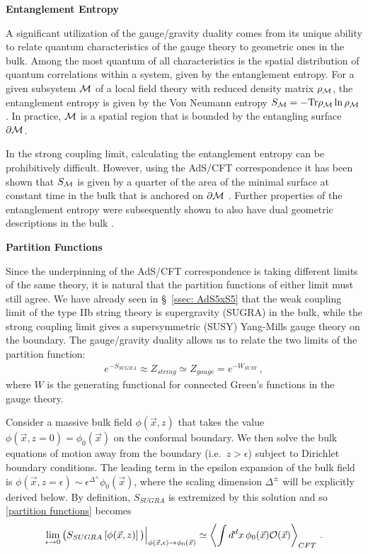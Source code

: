 \documentclass[../PhD.tex]{subfiles}
\begin{document}
\pagebreak

{\bf Entanglement Entropy}

A significant utilization of the gauge/gravity duality comes from its unique ability to relate quantum characteristics of the gauge theory to geometric ones in the bulk. Among the most quantum of all characteristics is the spatial distribution of quantum correlations within a system, given by the entanglement entropy. For a given subsystem $\mathcal M$ of a local field theory with reduced density matrix $\rho_{\mathcal M}$, the entanglement entropy is given by the Von Neumann entropy $S_{\mathcal M} = - \text{Tr} \rho_{\mathcal M} \ln \rho_{\mathcal M}$. In practice, $\mathcal M$ is a spatial region that is bounded by the entangling surface $\partial \mathcal M$.

In the strong coupling limit, calculating the entanglement entropy can be prohibitively difficult. However, using the AdS/CFT correspondence it has been shown that $S_{\mathcal M}$ is given by a quarter of the area of the minimal surface at constant time in the bulk that is anchored on $\partial \mathcal M$ \cite{hep-th/0603001}. Further properties of the entanglement entropy were subsequently shown to also have dual geometric descriptions in the bulk \cite{1304.4926}.

{\bf Partition Functions}

Since the underpinning of the AdS/CFT correspondence is taking different limits of the same theory, it is natural that the partition functions of either limit must still agree. We have already seen in \S~\!\ref{ssec: AdS5xS5} that the weak coupling limit of the type IIb string theory is supergravity (SUGRA) in the bulk, while the strong coupling limit gives a supersymmetric (SUSY) Yang-Mills gauge theory on the boundary. The gauge/gravity duality allows us to relate the two limits of the partition function:
\begin{align}
\label{partition functions}
e^{-S_{SUGRA}} \approx Z_{string} \simeq Z_{gauge} = e^{-W_{SUSY}} \, ,
\end{align}
where $W$ is the generating functional for connected Green's functions in the gauge theory.

Consider a massive bulk field $\phi(\vec x,z)$ that takes the value $\phi(\vec x, z=0) = \phi_0 (\vec x)$ on the conformal boundary. We then solve the bulk equations of motion away from the boundary (i.e.~$z > \epsilon$) subject to Dirichlet boundary conditions. The leading term in the epsilon expansion of the bulk field is $\phi(\vec x, z=\epsilon) \sim \epsilon^{\Delta^\pm} \phi_0(\vec x)$, where the scaling dimension $\Delta^\pm$ will be explicitly derived below. By definition, $S_{SUGRA}$ is extremized by this solution and so \eqref{partition functions} becomes \cite{hep-th/9802109, hep-th/9802150}
\begin{align}
\label{ads/cft duality}
\lim_{\epsilon \to 0} \big( S_{SUGRA} \left[ \phi(\vec x, z) \right] \big) \Big|_{\phi (\vec x, \epsilon) \to \phi_0(\vec x)} \simeq \left\langle \int d^dx \, \phi_0(\vec x) \mathcal O(\vec x) \right\rangle_{CFT} \, .
\end{align}
\end{document}
